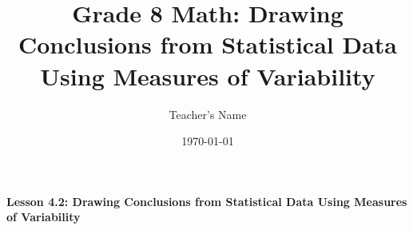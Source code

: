  \begin{center}
\textbf{Lesson 4.2: Drawing Conclusions from Statistical Data Using Measures of Variability}
\end{center}

\vspace*{1ex}

\documentclass[12pt]{article}
\usepackage{amsmath}

\title{Grade 8 Math: Drawing Conclusions from Statistical Data Using Measures of Variability}
\author{Teacher's Name}
\date{\today}



\maketitle

\section*{Lesson Overview}

In this lesson, students will focus on interpreting statistical data using measures of variability, such as range, mean deviation, and standard deviation. These measures will help students understand how spread out the data is and draw conclusions about the consistency, reliability, or trends in the data set.

\section*{Key Terms}

\begin{itemize}
    \item \textbf{Range}: The difference between the highest and lowest data values.
    \item \textbf{Mean Deviation}: The average of the absolute differences between each data value and the mean.
    \item \textbf{Standard Deviation}: A measure of how much the data values deviate from the mean, calculated as the square root of the variance.
    \item \textbf{Interpretation}: The process of drawing conclusions about data based on its variability, determining if the data is consistent, spread out, or shows any particular trend.
\end{itemize}

\section*{Steps for Interpretation of Data Using Variability Measures}

